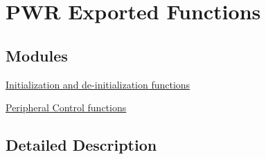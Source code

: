 \hypertarget{group___p_w_r___exported___functions}{\section{P\-W\-R Exported Functions}
\label{group___p_w_r___exported___functions}
}
\subsection*{Modules}
\begin{DoxyCompactItemize}
\item 
\hyperlink{group___p_w_r___exported___functions___group1}{Initialization and de-\/initialization functions}
\item 
\hyperlink{group___p_w_r___exported___functions___group2}{Peripheral Control functions}
\end{DoxyCompactItemize}


\subsection{Detailed Description}
